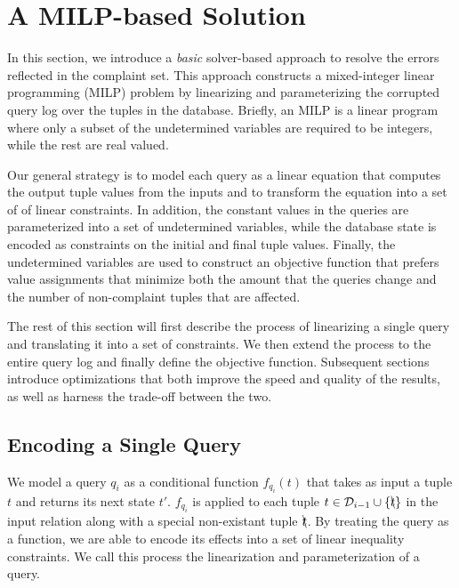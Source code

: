 
\section{A MILP-based Solution}
\label{sec:sol}

In this section, we introduce a \emph{basic} solver-based approach to 
resolve the errors reflected in the complaint set.
This approach constructs a mixed-integer linear 
programming (MILP) problem by linearizing and parameterizing the 
corrupted query log over the tuples in the database. 
Briefly, an MILP is a linear program where only a subset of the undetermined variables
are required to be integers, while the rest are real valued.

Our general strategy is to model each query as a linear equation 
that computes the output tuple values from the inputs and to transform the
equation into a set of of linear constraints.   
In addition, the constant values in the queries are parameterized
into a set of undetermined variables, while the database state is encoded 
as constraints on the initial and final tuple values.
Finally, the undetermined variables are used to construct an objective function
that prefers value assignments that minimize both the amount that the queries change and
the number of non-complaint tuples that are affected. 

The rest of this section will first describe the process of linearizing a single query
and translating it into a set of constraints.  We then extend the process to the entire
query log and finally define the objective function.
Subsequent sections introduce optimizations that both
improve the speed and quality of the results, as well as harness the trade-off between the two. 








\subsection{Encoding a Single Query}
\label{sec:linearize}

  We model a query $q_i$ as a conditional function $f_{q_i}(t)$ that takes as input a tuple $t$
  and returns its next state $t'$.  $f_{q_i}$ is applied to each 
  tuple $t \in \mathcal{D}_{i-1} \cup \{\bcancel{t}\}$ in the input relation along with a special
  non-existant tuple $\bcancel{t}$. 
  By treating the query as a function, we are able to encode its effects into a set
  of linear inequality constraints.  We call this process the linearization and 
  parameterization of a query.

